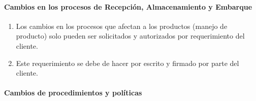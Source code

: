 \paragraph{Cambios en los procesos de Recepción, Almacenamiento y Embarque}

\begin{enumerate}
	\item Los cambios en los procesos que afectan a los productos (manejo de producto) solo pueden ser solicitados y autorizados por requerimiento del cliente.
	\item Este requerimiento se debe de hacer por escrito y firmado por parte del cliente.
\end{enumerate}

\paragraph{Cambios de procedimientos y políticas}

